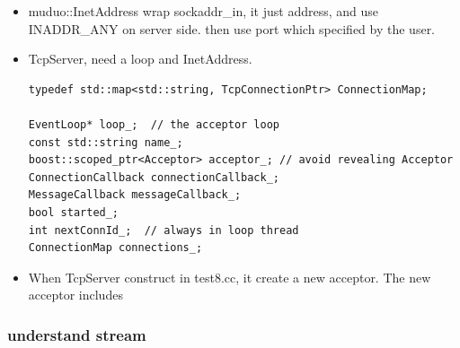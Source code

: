 \documentclass[a4paper,11pt,twoside]{book}
\begin{document}
\begin{itemize}
	\item muduo::InetAddress wrap sockaddr\_in, it just address, and use INADDR\_ANY on server side. then use port which specified by the user. 
	
	\item TcpServer, need a loop and InetAddress.
\begin{lstlisting}[numbers=none]
typedef std::map<std::string, TcpConnectionPtr> ConnectionMap;

EventLoop* loop_;  // the acceptor loop
const std::string name_;
boost::scoped_ptr<Acceptor> acceptor_; // avoid revealing Acceptor
ConnectionCallback connectionCallback_;
MessageCallback messageCallback_;
bool started_;
int nextConnId_;  // always in loop thread
ConnectionMap connections_;
\end{lstlisting}
	
	\item When TcpServer construct in test8.cc, it create a new acceptor. The new acceptor includes 	
\end{itemize}
\subsubsection{understand stream}
\end{document}
